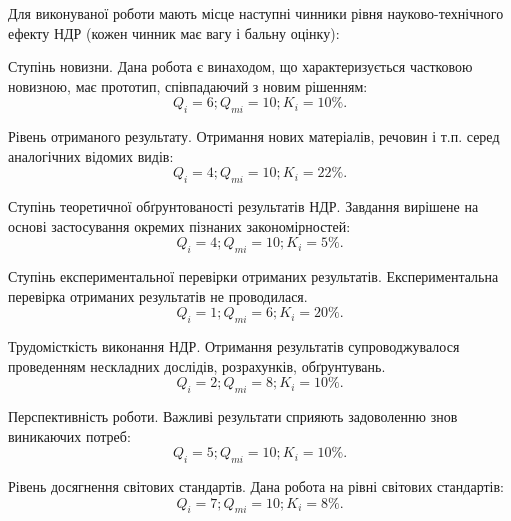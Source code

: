 Для виконуваної роботи мають місце наступні чинники рівня науково-технічного ефекту НДР (кожен чинник має вагу і бальну оцінку):
\begin{longEnumerate}
\item Ступінь новизни. Дана робота є винаходом, що характеризується частковою новизною, має прототип, співпадаючий з новим рішенням:
\begin{equation}
Q_i = 6; Q_{mi} = 10; K_i = 10\%. \nonumber
\end{equation}

\item Рівень отриманого результату. Отримання нових матеріалів, речовин і т.п. серед аналогічних відомих видів:
\begin{equation}
Q_i = 4; Q_{mi} = 10; K_i = 22\%. \nonumber
\end{equation}

\item Ступінь теоретичної обґрунтованості результатів НДР. Завдання вирішене на основі застосування окремих пізнаних закономірностей:
\begin{equation}
Q_i = 4; Q_{mi} = 10; K_i = 5\%. \nonumber
\end{equation}

\item Ступінь експериментальної перевірки отриманих результатів. Експериментальна перевірка отриманих результатів не проводилася.
\begin{equation}
Q_i = 1; Q_{mi} = 6; K_i = 20\%. \nonumber
\end{equation}

\item Трудомісткість виконання НДР. Отримання результатів супроводжувалося проведенням нескладних дослідів, розрахунків, обґрунтувань.
\begin{equation}
Q_i = 2; Q_{mi} = 8; K_i = 10\%. \nonumber
\end{equation}

\item Перспективність роботи. Важливі результати сприяють задоволенню знов виникаючих потреб:
\begin{equation}
Q_i = 5; Q_{mi} = 10; K_i = 10\%. \nonumber
\end{equation}

\item Рівень досягнення світових стандартів. Дана робота на рівні світових стандартів:
\begin{equation}
Q_i = 7; Q_{mi} = 10; K_i = 8\%. \nonumber
\end{equation}


\end{longEnumerate}
